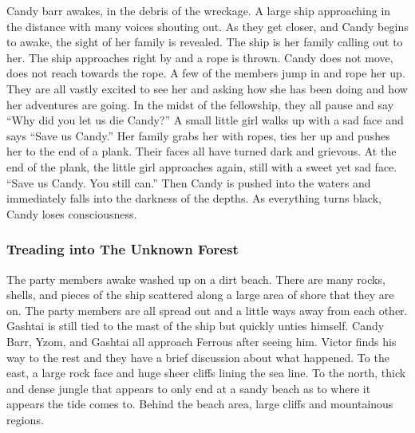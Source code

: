 Candy barr awakes, in the debris of the wreckage. A large ship approaching in the distance with many voices shouting out. As they get closer, and Candy begins to awake, the sight of her family is revealed. The ship is her family calling out to her. The ship approaches right by and a rope is thrown. Candy does not move, does not reach towards the rope. A few of the members jump in and rope her up. They are all vastly excited to see her and asking how she has been doing and how her adventures are going. In the midst of the fellowship, they all pause and say ``Why did you let us die Candy?'' A small little girl walks up with a sad face and says ``Save us Candy.'' Her family grabs her with ropes, ties her up and pushes her to the end of a plank. Their faces all have turned dark and grievous. At the end of the plank, the little girl approaches again, still with a sweet yet sad face. ``Save us Candy. You still can.'' Then Candy is pushed into the waters and immediately falls into the darkness of the depths. As everything turns black, Candy loses consciousness. 

\subsubsection{Treading into The Unknown Forest}

The party members awake washed up on a dirt beach. There are many rocks, shells, and pieces of the ship scattered along a large area of shore that they are on. The party members are all spread out and a little ways away from each other. Gashtai is still tied to the mast of the ship but quickly unties himself. Candy Barr, Yzom, and Gashtai all approach Ferrous after seeing him. Victor finds his way to the rest and they have a brief discussion about what happened. To the east, a large rock face and huge sheer cliffs lining the sea line. To the north, thick and dense jungle that appears to only end at a sandy beach as to where it appears the tide comes to. Behind the beach area, large cliffs and mountainous regions.


